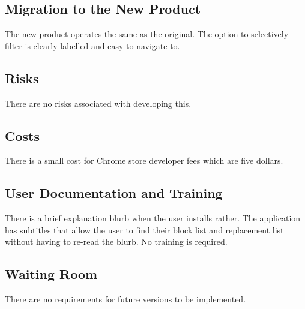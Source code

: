 \documentclass[12pt, titlepage]{article}
\begin{document}
\subsection{Migration to the New Product}
The new product operates the same as the original. The option to selectively filter is clearly labelled and easy to navigate to.

\subsection{Risks}
There are no risks associated with developing this.

\subsection{Costs}
There is a small cost for Chrome store developer fees which are five dollars.

\subsection{User Documentation and Training}
There is a brief explanation blurb when the user installs rather. The application has subtitles that allow the user to find their block list and replacement list without having to re-read the blurb. No training is required.

\subsection{Waiting Room}
There are no requirements for future versions to be implemented.
\end{document}
